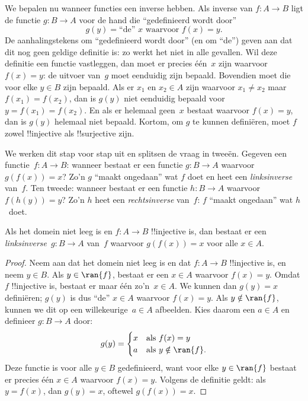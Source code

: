 \documentclass[openany]{memoir}
\begin{document}
\begin{explain}
We bepalen nu wanneer functies een inverse hebben. Als inverse van
$f\colon A \to B$ ligt de functie $g\colon B \to A$ voor de hand die
``gedefinieerd wordt door''
\[
g(y) = \text{``de'' $x$ waarvoor $f(x) = y$.}
\]
De aanhalingstekens om ``gedefinieerd wordt door'' (en om ``de'')
geven aan dat dit nog geen geldige definitie is: zo werkt het niet in
alle gevallen. Wil deze definitie een functie
vastleggen, dan moet er precies één~$x$ zijn waarvoor $f(x) = y$:
de uitvoer van~$g$ moet eenduidig zijn bepaald. Bovendien moet die
voor elke $y \in B$ zijn bepaald. Als er $x_1$ en $x_2 \in A$ zijn
waarvoor $x_1 \neq x_2$ maar $f(x_1) = f(x_2)$, dan is $g(y)$ niet
eenduidig bepaald voor $y = f(x_1) = f(x_2)$. En als er helemaal
geen~$x$ bestaat waarvoor $f(x) = y$, dan is $g(y)$ helemaal
niet bepaald. Kortom, om $g$ te kunnen definiëren, moet $f$ zowel
!!{injective} als !!{surjective} zijn.

We werken dit stap voor stap uit en splitsen de vraag in tweeën.
Gegeven een functie~$f\colon A \to B$: wanneer bestaat er een functie
$g\colon B \to A$ waarvoor $g(f(x)) = x$? Zo'n $g$ ``maakt ongedaan''
wat $f$ doet en heet een \emph{linksinverse} van~$f$. Ten tweede:
wanneer bestaat er een functie $h\colon B \to A$ waarvoor
$f(h(y)) = y$? Zo'n $h$ heet een \emph{rechtsinverse} van~$f$:
$f$ ``maakt ongedaan'' wat $h$~doet.
\end{explain}

\begin{prop}
Als het domein niet leeg is en $f\colon A \to B$ !!{injective} is, dan
bestaat er een
\emph{linksinverse}~$g\colon B \to A$ van~$f$ waarvoor
$g(f(x)) = x$ voor alle $x \in A$.
\end{prop}

\begin{proof}
Neem aan dat het domein niet leeg is en dat $f\colon A \to B$
!!{injective} is, en neem $y \in B$.
Als $y \in \ran{f}$, bestaat er een $x \in A$ waarvoor $f(x) = y$.
Omdat $f$ !!{injective} is, bestaat er maar één zo'n~$x \in A$. We
kunnen dan $g(y) = x$ definiëren; $g(y)$ is dus ``de'' $x \in A$
waarvoor $f(x) = y$. Als $y \notin \ran{f}$, kunnen we dit op een
willekeurige~$a \in A$ afbeelden. Kies daarom een $a \in A$ en
definieer $g\colon B \to A$ door:
\[
g(y) = \begin{cases}
    x & \text{als $f(x) = y$}\\
    a & \text{als $y \notin \ran{f}$.}
\end{cases}
\]
Deze functie is voor alle $y \in B$ gedefinieerd, want voor elke
$y \in \ran{f}$ bestaat er precies één $x \in A$ waarvoor $f(x) = y$.
Volgens de definitie geldt: als $y = f(x)$, dan $g(y) = x$, oftewel
$g(f(x)) = x$.
\end{proof}
\end{document}
